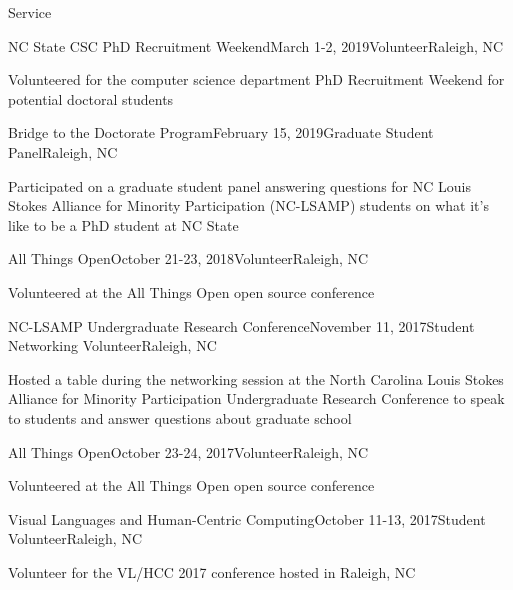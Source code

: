 \documentclass{resume} %
\begin{document}
\begin{rSection}{Service}

\begin{rSubsection}{NC State CSC PhD Recruitment Weekend}{March 1-2, 2019}{Volunteer}{Raleigh, NC}
\item Volunteered for the computer science department PhD Recruitment Weekend for potential doctoral students
\end{rSubsection}
\begin{rSubsection}{Bridge to the Doctorate Program}{February 15, 2019}{Graduate Student Panel}{Raleigh, NC}
\item Participated on a graduate student panel answering questions for NC Louis Stokes Alliance for Minority Participation (NC-LSAMP) students on what it's like to be a PhD student at NC State
\end{rSubsection}
\begin{rSubsection}{All Things Open}{October 21-23, 2018}{Volunteer}{Raleigh, NC}
\item Volunteered at the All Things Open open source conference
\end{rSubsection}
\begin{rSubsection}{NC-LSAMP Undergraduate Research Conference}{November 11, 2017}{Student Networking Volunteer}{Raleigh, NC}
\item Hosted a table during the networking session at the North Carolina Louis Stokes Alliance for Minority Participation Undergraduate Research Conference to speak to students and answer questions about graduate school
\end{rSubsection}
\begin{rSubsection}{All Things Open}{October 23-24, 2017}{Volunteer}{Raleigh, NC}
\item Volunteered at the All Things Open open source conference
\end{rSubsection}
\begin{rSubsection}{Visual Languages and Human-Centric Computing}{October 11-13, 2017}{Student Volunteer}{Raleigh, NC}
\item Volunteer for the VL/HCC 2017 conference hosted in Raleigh, NC
\end{rSubsection}

\end{rSection}
\end{document}
